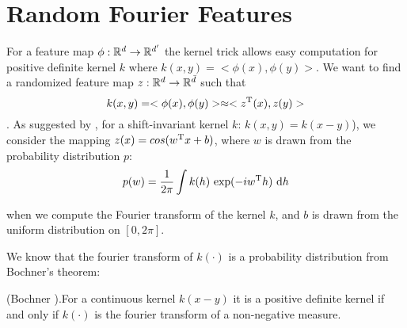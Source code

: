 \documentclass[twoside]{memoir}
\begin{document}
\section{Random Fourier Features} \label{sec:RFFs}
For a feature map $\phi: \mathbb{R}^d \rightarrow \mathbb{R}^{d'}$ the kernel trick allows easy computation for positive definite kernel $k$ where $k(x,y) = <\phi(x), \phi(y)>$. We want to find a randomized feature map $z: \mathbb{R}^d \rightarrow \mathbb{R}^{\bar{d}}$ such that 
\[ k(x,y) = <\phi(x), \phi(y)> \approx <z^{\text{T}}(x), z(y)> \].
As suggested by \cite{RFF_Rahimi}, for a shift-invariant kernel $k$: $k(x, y) = k(x - y)$), we consider the mapping $z(x) = cos(w^{\text{T}}x + b)$, where $w$ is drawn from the probability distribution $p$:
\begin{equation}
p(w) = \frac{1}{2\pi} \int k(h) ~ \text{exp}(-iw^{\text{T}}h) ~ \text{d}h
\label{eq:probFourier}
\end{equation} 

when we compute the Fourier transform of the kernel $k$, and $b$ is drawn from the uniform distribution on $[0, 2\pi]$.

We know that the fourier transform of $k(\cdot)$ is a probability distribution from Bochner's theorem:
\begin{thm} \label{thm:Bochner}
	(Bochner \cite{Rudin_1990}).For a continuous kernel $k(x - y)$  it is a positive definite kernel if and only if $k(\cdot)$ is the fourier transform of a non-negative measure.
\end{thm}
\end{document}
